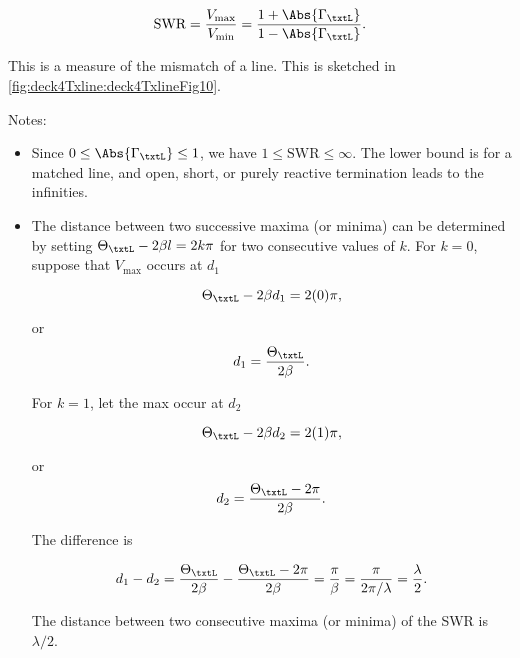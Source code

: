 \begin{equation}\label{eqn:uwaves4TransmissionLines:1200}
\textrm{SWR} = \frac{V_{\mathrm{max}}}{V_{\mathrm{min}}} = \frac{ 1 + \Abs{\Gamma_\txtL} }{ 1 - \Abs{\Gamma_\txtL} }.
\end{equation}

This is a measure of the mismatch of a line.  This is sketched in \cref{fig:deck4Txline:deck4TxlineFig10}.


Notes:

\begin{itemize}
\item Since \( 0 \le \Abs{\Gamma_\txtL} \le 1 \), we have \( 1 \le \textrm{SWR} \le \infty \).  The lower bound is for a matched line, and open, short, or purely reactive termination leads to the infinities.
\item The distance between two successive maxima (or minima) can be determined by setting \( \Theta_\txtL - 2 \beta l = 2 k \pi \) for two consecutive values of \( k \).  For \( k = 0 \), suppose that \( V_{\mathrm{max}} \) occurs at \( d_1 \)

\begin{dmath}\label{eqn:uwaves4TransmissionLines:1220}
\Theta_\txtL - 2 \beta d_1 = 2 (0) \pi,
\end{dmath}

or
\begin{dmath}\label{eqn:uwaves4TransmissionLines:1240}
d_1 = \frac{\Theta_\txtL}{2 \beta}.
\end{dmath}

For \( k = 1 \), let the max occur at \( d_2 \)

\begin{dmath}\label{eqn:uwaves4TransmissionLines:1260}
\Theta_\txtL - 2 \beta d_2 = 2 (1) \pi,
\end{dmath}

or
\begin{dmath}\label{eqn:uwaves4TransmissionLines:1280}
d_2 = \frac{\Theta_\txtL - 2 \pi}{2 \beta}.
\end{dmath}

The difference is

\begin{dmath}\label{eqn:uwaves4TransmissionLines:1300}
d_1 - d_2 
= \frac{\Theta_\txtL}{2 \beta} - \frac{\Theta_\txtL - 2 \pi}{2 \beta} 
= \frac{\pi}{\beta}
= \frac{\pi}{2 \pi/\lambda}
= \frac{\lambda}{2}.
\end{dmath}

The distance between two consecutive maxima (or minima) of the SWR is \( \lambda/2 \).

\end{itemize}

